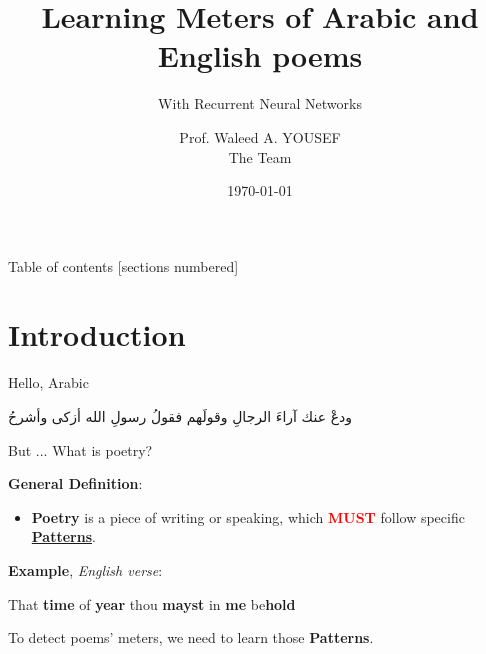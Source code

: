 \documentclass[10pt]{beamer}
\title{Learning Meters of Arabic and English poems}
\subtitle{With Recurrent Neural Networks}
\date{\today}
\author{
Prof. Waleed A. YOUSEF \\
The Team}
\institute{Computer Science department\\
Faulty of Computers and Information, Helwan University}
\begin{document}
\maketitle

\begin{frame}{Table of contents}
  [sections numbered]
  \tableofcontents[hideallsubsections]
\end{frame}



\section{Introduction}
\begin{frame}[fragile]{Hello, Arabic}
    \begin{center}
    \begin{Arabic}
    ودعْ عنك آراءَ الرجالِ وقولَهم\hspace{3em}  فقولُ رسولِ الله أزكى وأشرحُ
    \end{Arabic}
    \end{center}
\end{frame}


\begin{frame}[fragile]{But ... What is poetry?}

\textbf{\large General Definition}:
\begin{itemize}
  \item \textbf{Poetry} is a piece of writing or speaking, which
\textbf{\textcolor{red}{MUST}} follow specific
\alert{\underline{\textbf{Patterns}}}.
\end{itemize}

\vspace{0.5cm}
\textbf{\large Example}, \textit{\small English verse}:
\begin{center}
That 
  \textcolor{myGreen2}{\textbf{time}} of 
  \textcolor{myGreen2}{\textbf{year}} thou
  \textcolor{myGreen2}{\textbf{mayst}}  in 
  \textcolor{myGreen2}{\textbf{me}}
be\textcolor{myGreen2}{\textbf{hold}}
\end{center}

To detect poems' meters, we need to learn those \alert{\textbf{Patterns}}.
\end{frame}
\end{document}
